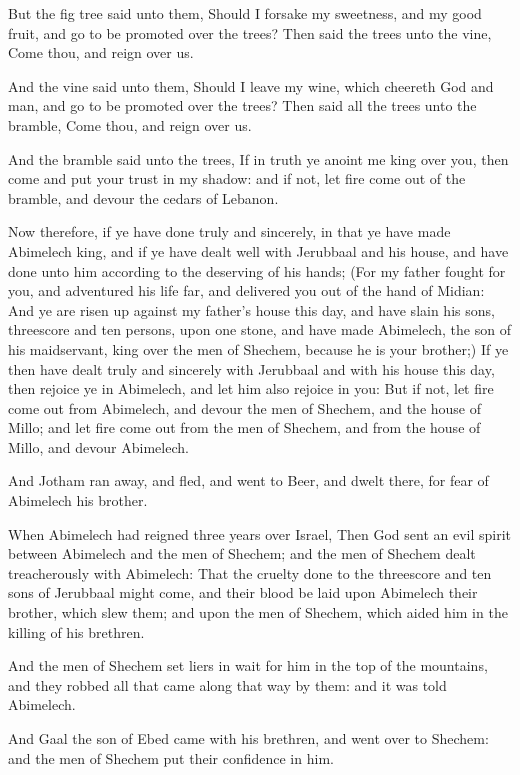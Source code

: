 \verse But the fig tree said unto them, Should I forsake my sweetness, and my good fruit, and go to be promoted over the trees?  \verse Then said the trees unto the vine, Come thou, and reign over us.

\verse And the vine said unto them, Should I leave my wine, which cheereth God and man, and go to be promoted over the trees?  \verse Then said all the trees unto the bramble, Come thou, and reign over us.

\verse And the bramble said unto the trees, If in truth ye anoint me king over you, then come and put your trust in my shadow: and if not, let fire come out of the bramble, and devour the cedars of Lebanon.

\verse Now therefore, if ye have done truly and sincerely, in that ye have made Abimelech king, and if ye have dealt well with Jerubbaal and his house, and have done unto him according to the deserving of his hands; \verse (For my father fought for you, and adventured his life far, and delivered you out of the hand of Midian: \verse And ye are risen up against my father's house this day, and have slain his sons, threescore and ten persons, upon one stone, and have made Abimelech, the son of his maidservant, king over the men of Shechem, because he is your brother;) \verse If ye then have dealt truly and sincerely with Jerubbaal and with his house this day, then rejoice ye in Abimelech, and let him also rejoice in you: \verse But if not, let fire come out from Abimelech, and devour the men of Shechem, and the house of Millo; and let fire come out from the men of Shechem, and from the house of Millo, and devour Abimelech.

\verse And Jotham ran away, and fled, and went to Beer, and dwelt there, for fear of Abimelech his brother.

\verse When Abimelech had reigned three years over Israel, \verse Then God sent an evil spirit between Abimelech and the men of Shechem; and the men of Shechem dealt treacherously with Abimelech: \verse That the cruelty done to the threescore and ten sons of Jerubbaal might come, and their blood be laid upon Abimelech their brother, which slew them; and upon the men of Shechem, which aided him in the killing of his brethren.

\verse And the men of Shechem set liers in wait for him in the top of the mountains, and they robbed all that came along that way by them: and it was told Abimelech.

\verse And Gaal the son of Ebed came with his brethren, and went over to Shechem: and the men of Shechem put their confidence in him.

